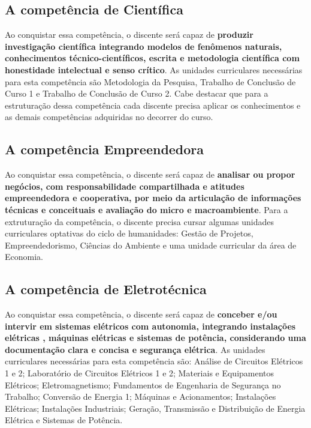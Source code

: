 \subsection{A competência de Científica}

Ao conquistar essa competência, o discente será capaz de \textbf{produzir investigação científica integrando modelos de fenômenos naturais, conhecimentos técnico-científicos, escrita e metodologia científica com honestidade intelectual e senso crítico}. As unidades curriculares necessárias para esta competência são Metodologia da Pesquisa, Trabalho de Conclusão de Curso 1 e Trabalho de Conclusão de Curso 2. Cabe destacar que para a estruturação dessa competência cada discente precisa aplicar os conhecimentos e as demais competências adquiridas no decorrer do curso.

\subsection{A competência Empreendedora}

Ao conquistar essa competência, o discente será capaz de \textbf{analisar ou propor negócios, com responsabilidade compartilhada e atitudes empreendedora e cooperativa, por meio da articulação de informações técnicas e conceituais e avaliação do micro e macroambiente}. Para a extruturação da competência, o discente precisa cursar algumas unidades curriculares optativas do ciclo de humanidades: Gestão de Projetos, Empreendedorismo, Ciências do Ambiente e uma unidade curricular da área de Economia.

\subsection{A competência de Eletrotécnica}

Ao conquistar essa competência, o discente será capaz de \textbf{conceber e/ou intervir em sistemas elétricos com autonomia, integrando instalações elétricas , máquinas elétricas e sistemas de potência, considerando uma documentação clara e concisa e segurança elétrica}. As unidades curriculares necessárias para esta competência são: Análise de Circuitos Elétricos 1 e 2; Laboratório de Circuitos Elétricos 1 e 2; Materiais e Equipamentos Elétricos; Eletromagnetismo; Fundamentos de Engenharia de Segurança no Trabalho; Conversão de Energia 1; Máquinas e Acionamentos; Instalações Elétricas; Instalações Industriais; Geração, Transmissão e Distribuição de Energia Elétrica e Sistemas de Potência.

